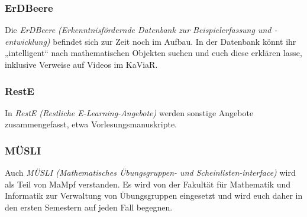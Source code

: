 \subsubsection{ErDBeere}
Die \emph{ErDBeere (Erkenntnisfördernde Datenbank zur Beispielerfassung und -entwicklung)} befindet sich zur Zeit noch im Aufbau. In der Datenbank könnt ihr „intelligent“ nach mathematischen Objekten suchen und euch diese erklären lasse, inklusive Verweise auf Videos im KaViaR.

\subsubsection{RestE}
In \emph{RestE (Restliche E-Learning-Angebote)} werden sonstige Angebote zusammengefasst, etwa Vorlesungsmanuskripte.

\subsubsection{MÜSLI}
Auch \emph{MÜSLI (Mathematisches Übungsgruppen- und Scheinlisten-interface)} wird als Teil von MaMpf verstanden. Es wird von der Fakultät für Mathematik und Informatik zur Verwaltung von Übungsgruppen eingesetzt und wird euch daher in den ersten Semestern auf jeden Fall begegnen.

